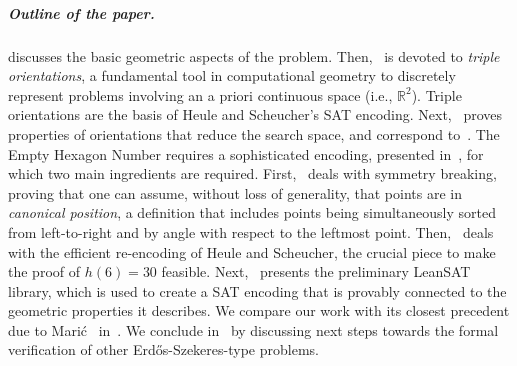 \subparagraph*{Outline of the paper.}
 discusses the basic geometric aspects of the problem.  Then,~ is devoted to \emph{triple orientations}, a fundamental tool in computational geometry to discretely represent problems involving an a priori continuous space (i.e., $\mathbb{R}^2$).
 Triple orientations are the basis of Heule and Scheucher's SAT encoding.
 Next,~ proves properties of orientations that reduce the search space,
and correspond to~.
The Empty Hexagon Number requires a sophisticated encoding, presented in~, for which two main ingredients are required. First,~ deals with symmetry breaking, proving that one can assume, without loss of generality, that points are in \emph{canonical position}, a definition that includes points being simultaneously sorted from left-to-right and by angle with respect to the leftmost point.
Then,~ deals with the efficient re-encoding of Heule and Scheucher, the crucial piece to make the proof of $h(6) = 30$ feasible. Next,~ presents the preliminary \textsf{LeanSAT} library, which is used to create a SAT encoding that is provably connected to the geometric properties it describes. We compare our work with its closest precedent due to Marić~\cite{19maric_fast_formal_proof_erdos_szekeres_conjecture_convex_polygons_most_six_points} in~. We conclude in~ by discussing next steps towards the formal verification of other Erd\H{o}s-Szekeres-type problems.

